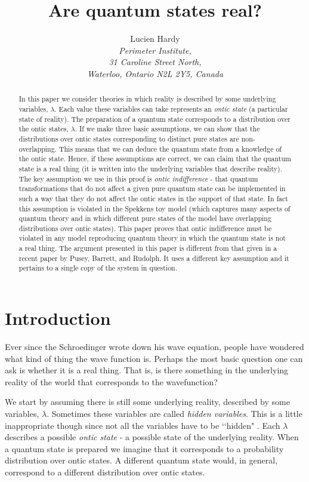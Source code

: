 \documentclass[12pt]{article}
\title{\textbf{Are quantum states real?}} \author{Lucien Hardy\\ \textit{Perimeter Institute,}\\ \textit{31 Caroline Street North,}\\ \textit{Waterloo, Ontario N2L 2Y5, Canada}}
\begin{document}
\maketitle


\begin{abstract} In this paper we consider theories in which reality is described by some underlying variables, $\lambda$.  Each
value these variables can take represents an \emph{ontic state} (a particular state of reality). The preparation of a quantum state corresponds to a distribution over the ontic states,
$\lambda$.   If we make three basic assumptions, we can show that the distributions over ontic states corresponding to distinct pure states are non-overlapping.  This means that we can deduce the quantum state from a knowledge of the ontic state. Hence, if these assumptions are correct, we can claim that the quantum state is a real thing (it is written into the underlying variables that describe reality).  The key assumption we use in this proof is \emph{ontic indifference} - that quantum transformations that do not affect a given pure quantum state can be implemented in such a way that they do not affect the ontic states in the support of that state.  In fact this assumption is violated in the Spekkens toy model (which captures many aspects of quantum theory and in which different pure states of the model have overlapping distributions over ontic states).   This paper proves that ontic indifference must be violated in any model reproducing quantum theory in which the quantum state is not a real thing.  The argument presented in this paper is different from that given in a recent paper by Pusey, Barrett, and Rudolph.  It uses a different key assumption and it pertains to a single copy of the system in question.
\end{abstract}

\newpage

\section{Introduction} \label{introduction}

Ever since the Schroedinger wrote down his wave equation, people have wondered what kind of thing the wave function is.  Perhaps the most basic question one can ask is whether it is a real
thing.  That is, is there something in the underlying reality of the world that corresponds to the wavefunction?

We start by assuming there is still some underlying reality, described by some variables, $\lambda$.  Sometimes these variables are called \emph{hidden variables}.  This is a little
inappropriate though since not all the variables have to be \lq\lq hidden" \cite{bell2004speakable}.  Each $\lambda$ describes a possible \emph{ontic state} - a possible state of the
underlying reality.  When a quantum state is prepared we imagine that it corresponds to a probability distribution over ontic states.  A different quantum state would, in general, correspond
to a different distribution over ontic states.
\end{document}
